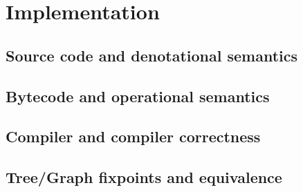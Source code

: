 \section{Implementation}

    \subsection{Source code and denotational semantics}


    \subsection{Bytecode and operational semantics}


    \subsection{Compiler and compiler correctness}


    \subsection{Tree/Graph fixpoints and equivalence}

